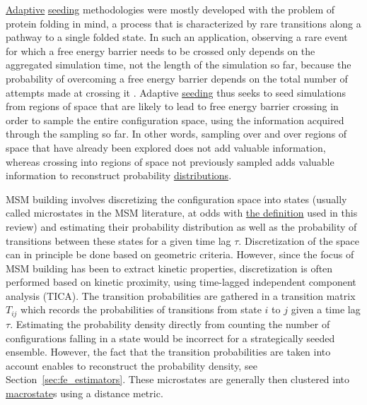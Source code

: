\documentclass[9pt,review]{livecoms}
\begin{document}
\hyperlink{ref:Adaptive} {Adaptive} \hyperlink{ref:Seeding} {seeding} methodologies were mostly developed with the problem of protein folding in mind, a process that is characterized by rare transitions along a pathway to a single folded state. In such an application, observing a rare event for which a free energy barrier needs to be crossed only depends on the aggregated simulation time, not the length of the simulation so far, because the probability of overcoming a free energy barrier depends on the total number of attempts made at crossing it \cite{PhysRevLett.86.4983,doi:10.1021/acs.jctc.8b00500}. Adaptive \hyperlink{ref:Seeding} {seeding} thus seeks to seed simulations from regions of space that are likely to lead to free energy barrier crossing in order to sample the entire configuration space, using the information acquired through the sampling so far. In other words, sampling over and over regions of space that have already been explored does not add valuable information, whereas crossing into regions of space not previously sampled adds valuable information to reconstruct probability \hyperlink{ref:Distribution} {distributions}.

MSM building involves discretizing the configuration space into states (usually called microstates in the MSM literature, at odds with \hyperlink{ref:Microstate} {the definition} used in this review) and estimating their probability distribution as well as the probability of transitions between these states for a given time lag $\tau$. Discretization of the space can in principle be done based on geometric criteria. However, since the focus of MSM building has been to extract kinetic properties, discretization is often performed based on kinetic proximity, using time-lagged independent component analysis (TICA). The transition probabilities are gathered in a transition matrix $T_{ij}$ which records the probabilities of transitions from state $i$ to $j$ given a time lag $\tau$. Estimating the probability density directly from counting the number of configurations falling in a state would be incorrect for a strategically seeded ensemble. However, the fact that the transition probabilities are taken into account enables to reconstruct the probability density, see Section~\ref{sec:fe_estimators}. These microstates are generally then clustered into \hyperlink{ref:Macrostate} {macrostate}s using a distance metric.
\end{document}
